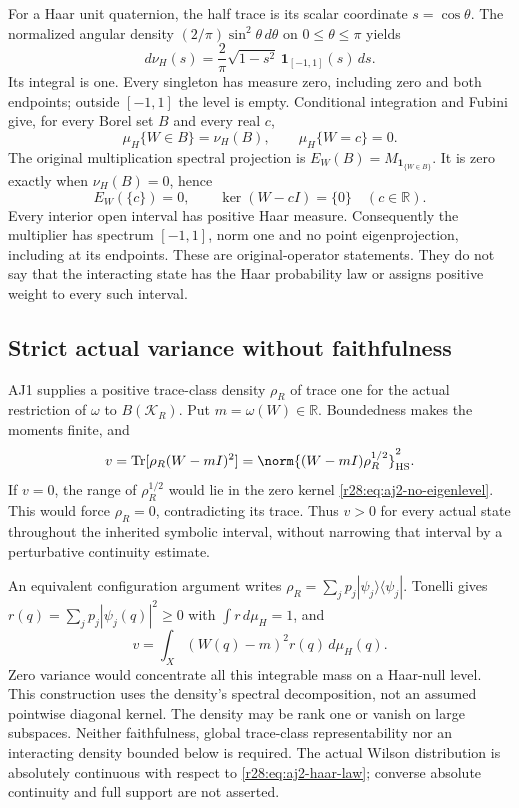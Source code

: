 For a Haar unit quaternion, the half trace is its scalar coordinate $s=\cos\theta$. The normalized angular density $(2/\pi)\sin^2\theta\,d\theta$ on $0\le\theta\le\pi$ yields
\begin{equation}
 d\nu_H(s)=\frac2\pi\sqrt{1-s^2}\,
             \mathbf1_{[-1,1]}(s)\,ds.
 \label{r28:eq:aj2-haar-law}
\end{equation}
Its integral is one. Every singleton has measure zero, including zero and both endpoints; outside $[-1,1]$ the level is empty. Conditional integration and Fubini give, for every Borel set $B$ and every real $c$,
\begin{equation}
 \mu_H\{W\in B\}=\nu_H(B),\qquad
 \mu_H\{W=c\}=0.
 \label{r28:eq:aj2-null-levels}
\end{equation}
The original multiplication spectral projection is $E_W(B)=M_{\mathbf1_{\{W\in B\}}}$. It is zero exactly when $\nu_H(B)=0$, hence
\begin{equation}
 E_W(\{c\})=0,
 \qquad\ker(W-cI)=\{0\}\quad(c\in\mathbb R).
 \label{r28:eq:aj2-no-eigenlevel}
\end{equation}
Every interior open interval has positive Haar measure. Consequently the multiplier has spectrum $[-1,1]$, norm one and no point eigenprojection, including at its endpoints. These are original-operator statements. They do not say that the interacting state has the Haar probability law or assigns positive weight to every such interval.

\subsection{Strict actual variance without faithfulness}
AJ1 supplies a positive trace-class density $\rho_R$ of trace one for the actual restriction of $\omega$ to $B(\mathcal K_R)$. Put $m=\omega(W)\in\mathbb R$. Boundedness makes the moments finite, and
\begin{equation}
 v=\operatorname{Tr}[\rho_R(W-mI)^2]
   =\norm{(W-mI)\rho_R^{1/2}}_{\rm HS}^2.
 \label{r28:eq:aj2-variance}
\end{equation}
If $v=0$, the range of $\rho_R^{1/2}$ would lie in the zero kernel \eqref{r28:eq:aj2-no-eigenlevel}. This would force $\rho_R=0$, contradicting its trace. Thus $v>0$ for every actual state throughout the inherited symbolic interval, without narrowing that interval by a perturbative continuity estimate.

An equivalent configuration argument writes $\rho_R=\sum_jp_j|\psi_j\rangle\langle\psi_j|$. Tonelli gives $r(q)=\sum_jp_j|\psi_j(q)|^2\ge0$ with $\int r\,d\mu_H=1$, and
\begin{equation}
 v=\int_X(W(q)-m)^2r(q)\,d\mu_H(q).
\end{equation}
Zero variance would concentrate all this integrable mass on a Haar-null level. This construction uses the density's spectral decomposition, not an assumed pointwise diagonal kernel. The density may be rank one or vanish on large subspaces. Neither faithfulness, global trace-class representability nor an interacting density bounded below is required. The actual Wilson distribution is absolutely continuous with respect to \eqref{r28:eq:aj2-haar-law}; converse absolute continuity and full support are not asserted.

